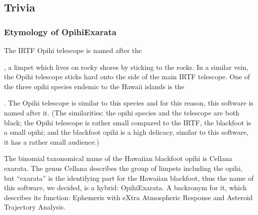 \documentclass[letterpaper,11pt,english]{sphinxmanual}
\begin{document}
\sphinxstepscope


\subsection{Trivia}
\label{\detokenize{user/trivia:trivia}}\label{\detokenize{user/trivia::doc}}

\subsubsection{Etymology of OpihiExarata}
\label{\detokenize{user/trivia:etymology-of-opihiexarata}}
\sphinxAtStartPar
The IRTF Opihi telescope is named after the %
\begin{footnote}[24]\sphinxAtStartFootnote
{}
%
\end{footnote}, a limpet which lives on
rocky shores by sticking to the rocks. In a similar vein, the Opihi telescope
sticks hard onto the side of the main IRTF telescope. One of the three opihi
species endemic to the Hawaii islands is the %
\begin{footnote}[25]\sphinxAtStartFootnote
{}
%
\end{footnote}. The
Opihi telescope is similar to this species and for this reason, this software
is named after it. (The similarities: the opihi species and the telescope are
both black; the Opihi telescope is rather small compared to the IRTF, the
blackfoot is a small opihi; and the blackfoot opihi is a high delicacy,
similar to this software, it has a rather small audience.)

\sphinxAtStartPar
The binomial taxonomical name of the Hawaiian blackfoot opihi is Cellana
exarata. The genus Cellana describes the group of limpets including the opihi,
but “exarata” is the identifying part for the Hawaiian blackfoot, thus the
name of this software, we decided, is a hybrid: OpihiExarata. A backronym for
it, which describes its function: Ephemeris with eXtra Atmospheric Response
and Asteroid Trajectory Analysis.
\end{document}
